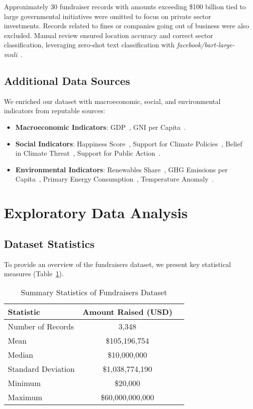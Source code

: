 \documentclass[sigconf]{acmart}
\begin{document}
Approximately 30 fundraiser records with amounts exceeding \$100 billion tied to large governmental initiatives were omitted to focus on private sector investments. Records related to fines or companies going out of business were also excluded. Manual review ensured location accuracy and correct sector classification, leveraging zero-shot text classification with \textit{facebook/bart-large-mnli}~\cite{lewis2020bart}.

\subsection{Additional Data Sources}

We enriched our dataset with macroeconomic, social, and environmental indicators from reputable sources:

\begin{itemize}
    \item \textbf{Macroeconomic Indicators}: GDP~\cite{WorldBankGDP2024}, GNI per Capita~\cite{OWIDGNI2022}.
    \item \textbf{Social Indicators}: Happiness Score~\cite{OWIDHappiness2023}, Support for Climate Policies~\cite{OWIDClimatePolicies2024}, Belief in Climate Threat~\cite{OWIDClimateBeliefs2024}, Support for Public Action~\cite{OWIDPublicClimateAction2024}.
    \item \textbf{Environmental Indicators}: Renewables Share~\cite{OWIDRenewableEnergy2023}, GHG Emissions per Capita~\cite{OWIDTotalGHGPerCapita2024}, Primary Energy Consumption~\cite{OWIDPrimaryEnergy2023}, Temperature Anomaly~\cite{OWIDTempAnomaly2024}.
\end{itemize}

\section{Exploratory Data Analysis}

\subsection{Dataset Statistics}

To provide an overview of the fundraisers dataset, we present key statistical measures (Table~\ref{tab:fundraisers_summary}).

\begin{table}[htpb]
    \centering
    \caption{Summary Statistics of Fundraisers Dataset}
    \label{tab:fundraisers_summary}
    \begin{tabular}{lcc}
        \toprule
        Statistic & Amount Raised (USD) \\
        \midrule
        Number of Records & 3,348 \\
        Mean & \$105,196,754 \\
        Median & \$10,000,000 \\
        Standard Deviation & \$1,038,774,190 \\
        Minimum & \$20,000 \\
        Maximum & \$60,000,000,000 \\
        \bottomrule
    \end{tabular}
\end{table}
\end{document}

